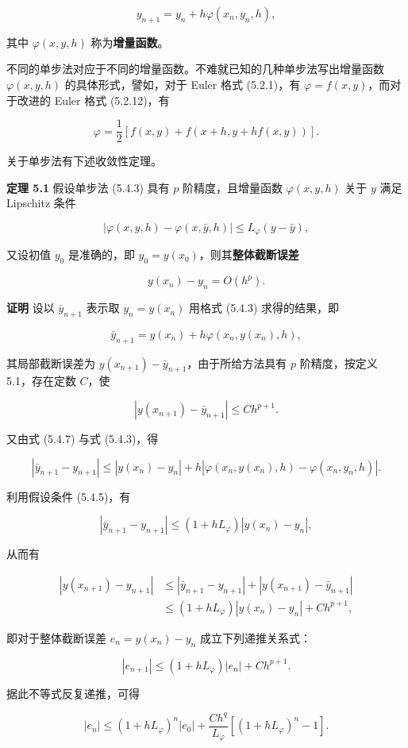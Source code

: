 \documentclass[
  10pt,
  fontset=fandol]{ctexart}
\begin{document}
\[
y_{n+1}=y_n+h\varphi(x_n,y_n,h),\tag{5.4.3}
\]

其中 \(\varphi(x,y,h)\) 称为\textbf{增量函数}。

不同的单步法对应于不同的增量函数。不难就已知的几种单步法写出增量函数 \(\varphi(x,y,h)\) 的具体形式，譬如，对于 Euler 格式 (5.2.1)，有 \(\varphi=f(x,y)\)，而对于改进的 Euler 格式 (5.2.12)，有

\[
\varphi=\frac12[f(x,y)+f(x+h,y+hf(x,y))].\tag{5.4.4}
\]

关于单步法有下述收敛性定理。

\textbf{定理 5.1} 假设单步法 (5.4.3) 具有 \(p\) 阶精度，且增量函数 \(\varphi(x,y,h)\) 关于 \(y\) 满足 Lipschitz 条件

\[
|\varphi(x,y,h)-\varphi(x,\bar y,h)|\leqslant L_\varphi(y-\bar y),\tag{5.4.5}
\]

又设初值 \(y_0\) 是准确的，即 \(y_0=y(x_0)\)，则其\textbf{整体截断误差}

\[
y(x_n)-y_n=O(h^p).\tag{5.4.6}
\]

\textbf{证明} 设以 \(\bar y_{n+1}\) 表示取 \(y_n=y(x_n)\) 用格式 (5.4.3) 求得的结果，即

\[
\bar y_{n+1}=y(x_n)+h\varphi(x_n,y(x_n),h),\tag{5.4.7}
\]

其局部截断误差为 \(y(x_{n+1})-\bar y_{n+1}\)，由于所给方法具有 \(p\) 阶精度，按定义 5.1，存在定数 \(C\)，使

\[
|y(x_{n+1})-\bar y_{n+1}|\leqslant Ch^{p+1}.
\]

又由式 (5.4.7) 与式 (5.4.3)，得

\[
|\bar y_{n+1}-y_{n+1}|\leqslant|y(x_n)-y_n|+h|\varphi(x_n,y(x_n),h)-\varphi(x_n,y_n,h)|.
\]

利用假设条件 (5.4.5)，有

\[
|\bar y_{n+1}-y_{n+1}|\leqslant(1+hL_\varphi)|y(x_n)-y_n|,
\]

从而有

\[
\begin{aligned}
|y(x_{n+1})-y_{n+1}|&\leqslant|\bar y_{n+1}-y_{n+1}|+|y(x_{n+1})-\bar y_{n+1}|\\
&\leqslant(1+hL_\varphi)|y(x_n)-y_n|+Ch^{p+1},
\end{aligned}
\]

即对于整体截断误差 \(e_n=y(x_n)-y_n\) 成立下列递推关系式：

\[
|e_{n+1}|\leqslant(1+hL_\varphi)|e_n|+Ch^{p+1}.\tag{5.4.8}
\]

据此不等式反复递推，可得

\[
|e_n|\leqslant(1+hL_\varphi)^n|e_0|+\frac{Ch^q}{L_\varphi}[(1+hL_\varphi)^n-1].\tag{5.4.9}
\]
\end{document}
